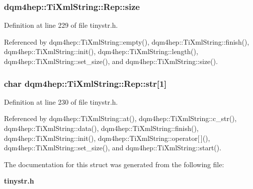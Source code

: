 \subsubsection[{size}]{ dqm4hep\+::\+Ti\+Xml\+String\+::\+Rep\+::size}\label{structdqm4hep_1_1TiXmlString_1_1Rep_af25dddcd9f978775825fdc08690024ae}


Definition at line 229 of file tinystr.\+h.



Referenced by dqm4hep\+::\+Ti\+Xml\+String\+::empty(), dqm4hep\+::\+Ti\+Xml\+String\+::finish(), dqm4hep\+::\+Ti\+Xml\+String\+::init(), dqm4hep\+::\+Ti\+Xml\+String\+::length(), dqm4hep\+::\+Ti\+Xml\+String\+::set\+\_\+size(), and dqm4hep\+::\+Ti\+Xml\+String\+::size().

\subsubsection[{str}]{\setlength{\rightskip}{0pt plus 5cm}char dqm4hep\+::\+Ti\+Xml\+String\+::\+Rep\+::str[1]}\label{structdqm4hep_1_1TiXmlString_1_1Rep_a7908d73773663004074c74eb3476ca49}


Definition at line 230 of file tinystr.\+h.



Referenced by dqm4hep\+::\+Ti\+Xml\+String\+::at(), dqm4hep\+::\+Ti\+Xml\+String\+::c\+\_\+str(), dqm4hep\+::\+Ti\+Xml\+String\+::data(), dqm4hep\+::\+Ti\+Xml\+String\+::finish(), dqm4hep\+::\+Ti\+Xml\+String\+::init(), dqm4hep\+::\+Ti\+Xml\+String\+::operator[$\,$](), dqm4hep\+::\+Ti\+Xml\+String\+::set\+\_\+size(), and dqm4hep\+::\+Ti\+Xml\+String\+::start().



The documentation for this struct was generated from the following file\+:\begin{DoxyCompactItemize}
\item 
{\bf tinystr.\+h}\end{DoxyCompactItemize}
